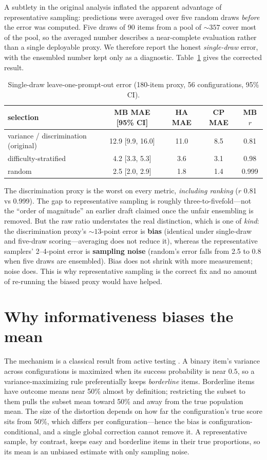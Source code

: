 A subtlety in the original analysis inflated the apparent advantage of representative
sampling: predictions were averaged over five random draws \emph{before} the error was
computed. Five draws of 90 items from a pool of ${\sim}357$ cover most of the pool, so the
averaged number describes a near-complete evaluation rather than a single deployable proxy.
We therefore report the honest \emph{single-draw} error, with the ensembled number kept only
as a diagnostic. Table~\ref{tab:lopo} gives the corrected result.

\begin{table}[H]
\centering
\caption{Single-draw leave-one-prompt-out error (180-item proxy, 56 configurations, 95\% CI).}
\label{tab:lopo}
\begin{tabular}{lcccc}
\toprule
selection & MB MAE [95\% CI] & HA MAE & CP MAE & MB $r$ \\
\midrule
variance / discrimination (original) & 12.9 [9.9, 16.0] & 11.0 & 8.5 & 0.81 \\
difficulty-stratified & 4.2 [3.3, 5.3] & 3.6 & 3.1 & 0.98 \\
random & 2.5 [2.0, 2.9] & 1.8 & 1.4 & 0.999 \\
\bottomrule
\end{tabular}
\end{table}

The discrimination proxy is the worst on every metric, \emph{including ranking} ($r$ 0.81 vs
0.999). The gap to representative sampling is roughly three-to-fivefold---not the ``order of
magnitude'' an earlier draft claimed once the unfair ensembling is removed. But the raw ratio
understates the real distinction, which is one of \emph{kind}: the discrimination proxy's
${\sim}13$-point error is \textbf{bias} (identical under single-draw and five-draw
scoring---averaging does not reduce it), whereas the representative samplers' 2--4-point error
is \textbf{sampling noise} (random's error falls from 2.5 to 0.8 when five draws are
ensembled). Bias does not shrink with more measurement; noise does. This is why
representative sampling is the correct fix and no amount of re-running the biased proxy would
have helped.

\section{Why informativeness biases the mean}

The mechanism is a classical result from active testing \citep{kossen2021activetesting}. A
binary item's variance across configurations is maximized when its success probability is
near $0.5$, so a variance-maximizing rule preferentially keeps \emph{borderline} items.
Borderline items have outcome means near 50\% almost by definition; restricting the subset to
them pulls the subset mean toward 50\% and away from the true population mean. The size of the
distortion depends on how far the configuration's true score sits from 50\%, which differs per
configuration---hence the bias is configuration-conditional, and a single global correction
cannot remove it. A representative sample, by contrast, keeps easy and borderline items in
their true proportions, so its mean is an unbiased estimate with only sampling noise.

